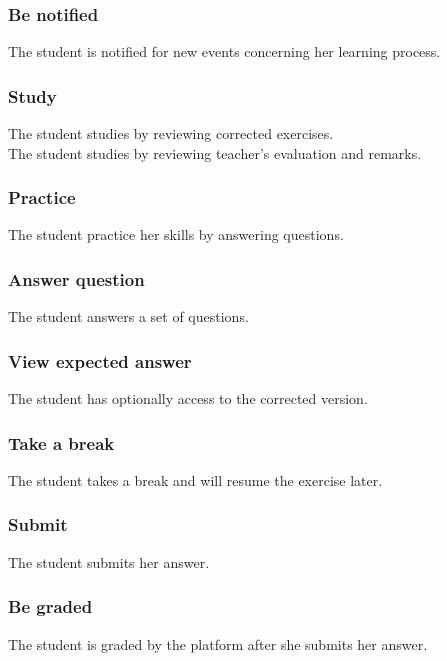 		\subsubsection{Be notified}
			The student is notified for new events concerning her learning process.
		\subsubsection{Study}
			The student studies by reviewing corrected exercises.\\
			The student studies by reviewing teacher's evaluation and remarks.
		\subsubsection{Practice}
			The student practice her skills by answering questions.
		\subsubsection{Answer question}
			The student answers a set of questions.
		\subsubsection{View expected answer}
			The student has optionally access to the corrected version.
		\subsubsection{Take a break}
			The student takes a break and will resume the exercise later.
		\subsubsection{Submit}
			The student submits her answer.
		\subsubsection{Be graded}
			The student is graded by the platform after she submits her answer.		
